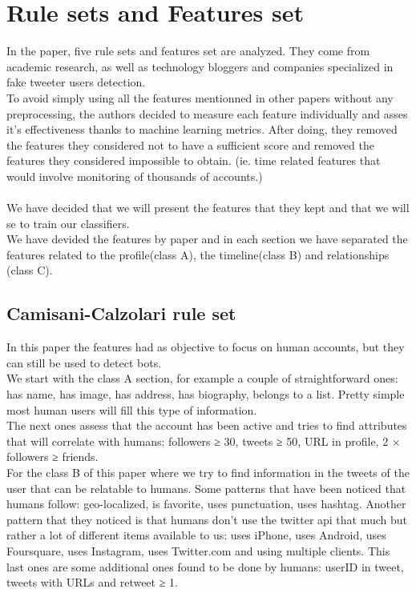 \documentclass[a4paper,11pt]{article}
\begin{document}
\section{Rule sets and Features set}
In the paper, five rule sets and features set are analyzed. They come from  academic research, as well as technology bloggers and companies specialized in fake tweeter users detection.\\

To avoid simply using all the features mentionned in other papers without any preprocessing, the authors decided to measure each feature individually and asses it's effectiveness thanks to machine learning metrics. After doing, they removed the features they considered not to have a sufficient score and removed the features they considered impossible to obtain. (ie. time related features that would involve monitoring of thousands of accounts.)
\\\\
We have decided that we will present the features that they kept and that we will se to train our classifiers.\\
We have devided the features by paper and in each section we have separated the features related to the profile(class A), the timeline(class B) and relationships (class C).

\subsection{Camisani-Calzolari rule set}
In this paper the features had as objective to focus on human accounts, but they can still be used to detect bots. \\
We start with the class A section, for example a couple of straightforward ones: has name, has image, has address, has biography, belongs to a list.
Pretty simple most human users will fill this type of information.\\
The next ones assess that the account has been active and tries to find attributes that will correlate with humans: followers ≥ 30, tweets ≥ 50, URL
in profile, 2 × followers ≥ friends.\\
For the class B of this paper where we try to find information in the tweets of the user that can be relatable to humans. Some patterns that have been noticed that humans follow: geo-localized, is favorite, uses punctuation, uses hashtag. Another pattern that they noticed is that humans don't use the twitter api that much but rather a lot of different items available to us: uses iPhone, uses Android, uses Foursquare, uses Instagram, uses Twitter.com and using multiple clients. This last ones are some additional ones found to be done by humans: userID in tweet,
tweets with URLs and retweet ≥ 1. 
\end{document}
